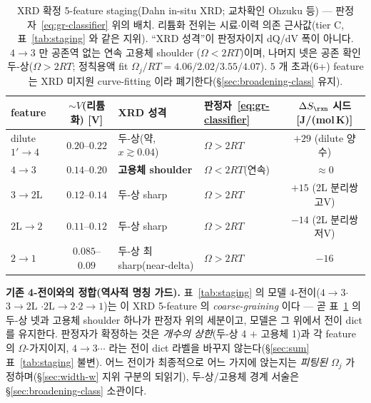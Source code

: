 \begin{table}[t]
\centering\footnotesize
\renewcommand{\arraystretch}{1.3}
\caption{XRD 확정 5-feature staging(Dahn in-situ XRD\cite{dahn1991}; 교차확인 Ohzuku 등\cite{ohzuku1993})
--- 판정자~\eqref{eq:gr-classifier} 위의 배치. 리튬화 전위는 시료$\cdot$이력 의존 근사값(tier C, 표~\ref{tab:staging}
와 같은 지위). ``XRD 성격''이 판정자이지 dQ/dV 폭이 아니다. $4\!\to\!3$ 만 공존역 없는 연속 고용체 shoulder
($\Omega<2RT$)이며, 나머지 넷은 공존 확인 두-상($\Omega>2RT$; 정칙용액 fit $\Omega_j/RT{=}4.06/2.02/3.55/4.07$).
$5$ 개 초과(6+) feature 는 XRD 미지원 curve-fitting 이라 폐기한다(\S\ref{sec:broadening-class} 유지).}
\label{tab:gr-2L-xrd}
\begin{tabular}{@{}l c l l c@{}}
\toprule
feature & $\sim V$(리튬화) [V] & XRD 성격 & 판정자~\eqref{eq:gr-classifier} & $\Delta S_\rxn$ 시드 [J/(mol\,K)] \\
\midrule
dilute $1'\!\to\!4$   & $0.20$--$0.22$ & 두-상(약, $x\!\gtrsim\!0.04$) & $\Omega>2RT$          & $+29$ (dilute 양수) \\
$4\!\to\!3$           & $0.14$--$0.20$ & \textbf{고용체 shoulder}      & $\Omega<2RT$(연속)     & $\approx0$ \\
$3\!\to\!2\mathrm L$  & $0.12$--$0.14$ & 두-상 sharp                    & $\Omega>2RT$          & $+15$ (2L 분리쌍 고V) \\
$2\mathrm L\!\to\!2$  & $0.11$--$0.12$ & 두-상 sharp                    & $\Omega>2RT$          & $-14$ (2L 분리쌍 저V) \\
$2\!\to\!1$           & $0.085$--$0.09$& 두-상 최sharp(near-delta)      & $\Omega>2RT$          & $-16$ \\
\bottomrule
\end{tabular}
\end{table}

\textbf{기존 4-전이와의 정합(역사적 명칭 가드).} 표~\ref{tab:staging} 의 모델 4-전이($4\!\to\!3$$\cdot$$3\!\to\!2\mathrm L$
$\cdot$$2\mathrm L\!\to\!2$$\cdot$$2\!\to\!1$)는 이 XRD 5-feature 의 \emph{coarse-graining} 이다 --- 곧 표~\ref{tab:gr-2L-xrd}
의 두-상 넷과 고용체 shoulder 하나가 판정자 위의 세분이고, 모델은 그 위에서 전이 dict 를 유지한다. 판정자가
확정하는 것은 \emph{개수의 상한}(두-상 4 $+$ 고용체 1)과 각 feature 의 $\Omega$-가지이지, $4\!\to\!3\!\cdots$ 라는
전이 dict 라벨을 바꾸지 않는다(\S\ref{sec:sum} 표~\ref{tab:staging} 불변). 어느 전이가 최종적으로 어느 가지에
앉는지는 \emph{피팅된} $\Omega_j$ 가 정하며(\S\ref{sec:width-w} 지위 구분의 되읽기), 두-상/고용체 경계 서술은
\S\ref{sec:broadening-class} 소관이다.

